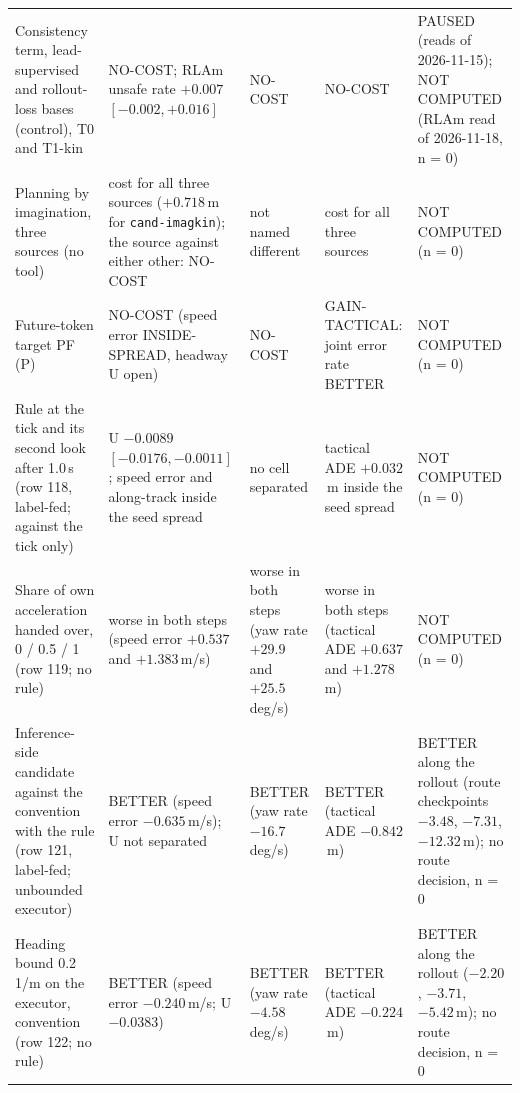 \documentclass[10pt,twocolumn]{article}
\theoremstyle{remark}
\newcommand{\tier}[1]{\textsc{\small #1}}
\begin{document}
\begin{table}[!tp]
\begin{tabularx}{\textwidth}{@{}>{\raggedright\arraybackslash}p{33mm}>{\raggedright\arraybackslash}X>{\raggedright\arraybackslash}X>{\raggedright\arraybackslash}X>{\raggedright\arraybackslash}p{19mm}@{}}
Consistency term, lead-supervised and rollout-loss bases (control), \tier{T0} and T1-kin & NO-COST; RLAm unsafe rate $+0.007$ $[-0.002,+0.016]$ & NO-COST & NO-COST & PAUSED (reads of 2026-11-15); NOT COMPUTED (RLAm read of 2026-11-18, n = 0) \\
Planning by imagination, three sources (no tool) & cost for all three sources ($+0.718$\,m for \texttt{cand-imagkin}); the source against either other: NO-COST & not named different & cost for all three sources & NOT COMPUTED (n = 0) \\
Future-token target PF (P) & NO-COST (speed error INSIDE-SPREAD, headway U open) & NO-COST & GAIN-TACTICAL: joint error rate BETTER & NOT COMPUTED (n = 0) \\
Rule at the tick and its second look after 1.0\,s (row 118, label-fed; against the tick only) & U $-0.0089$ $[-0.0176,-0.0011]$; speed error and along-track inside the seed spread & no cell separated & tactical ADE $+0.032$\,m inside the seed spread & NOT COMPUTED (n = 0) \\
Share of own acceleration handed over, 0 / 0.5 / 1 (row 119; no rule) & worse in both steps (speed error $+0.537$ and $+1.383$\,m/s) & worse in both steps (yaw rate $+29.9$ and $+25.5$\,deg/s) & worse in both steps (tactical ADE $+0.637$ and $+1.278$\,m) & NOT COMPUTED (n = 0) \\
Inference-side candidate against the convention with the rule (row 121, label-fed; unbounded executor) & BETTER (speed error $-0.635$\,m/s); U not separated & BETTER (yaw rate $-16.7$\,deg/s) & BETTER (tactical ADE $-0.842$\,m) & BETTER along the rollout (route checkpoints $-3.48$, $-7.31$, $-12.32$\,m); no route decision, n = 0 \\
Heading bound 0.2\,1/m on the executor, convention (row 122; no rule) & BETTER (speed error $-0.240$\,m/s; U $-0.0383$) & BETTER (yaw rate $-4.58$\,deg/s) & BETTER (tactical ADE $-0.224$\,m) & BETTER along the rollout ($-2.20$, $-3.71$, $-5.42$\,m); no route decision, n = 0 \\
\bottomrule
\end{tabularx}
\end{table}
\end{document}
